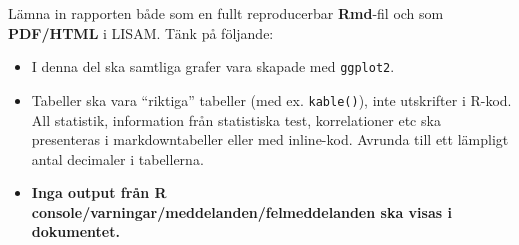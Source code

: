 \documentclass[swedish,english]{article}\usepackage[]{graphicx}\usepackage[]{xcolor}
\begin{document}
\pagebreak Lämna in rapporten både som en fullt reproducerbar \textbf{Rmd}-fil
och som \textbf{PDF/HTML} i LISAM. Tänk på följande:
\begin{itemize}
\item I denna del ska samtliga grafer vara skapade med \texttt{ggplot2}.
\item Tabeller ska vara “riktiga” tabeller (med ex. \texttt{kable()}),
inte utskrifter i R-kod. All statistik, information från statistiska
test, korrelationer etc ska presenteras i markdowntabeller eller med
inline-kod. Avrunda till ett lämpligt antal decimaler i tabellerna.
\item \textbf{Inga output från R console/varningar/meddelanden/felmeddelanden
ska visas i dokumentet.}
\end{itemize}
\end{document}
